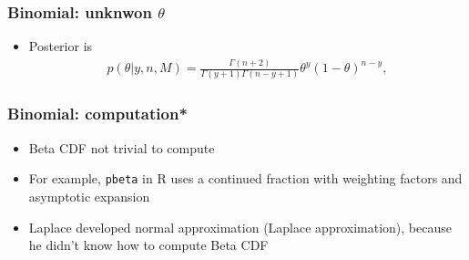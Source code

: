 \documentclass[english,t]{beamer}
\begin{document}
\begin{frame}
  \frametitle{Binomial: unknwon $\theta$}

  \begin{itemize}
  \item Posterior is
    \begin{align*}
      p(\theta|y,n,M) = \frac{\Gamma(n+2)}{\Gamma(y+1)\Gamma(n-y+1)}\theta^y(1-\theta)^{n-y},
    \end{align*}
  \end{itemize}
  \vspace{0.5\baselineskip}
  \begin{center}
  \end{center}
\end{frame}

\begin{frame}
  \frametitle{Binomial: computation*}

  \begin{itemize}
  \item Beta CDF not trivial to compute
  \item For example, {\tt pbeta} in R uses a continued fraction with
    weighting factors and asymptotic expansion
  \item Laplace developed normal approximation (Laplace
    approximation), because he didn't know how to compute Beta CDF
  \end{itemize}

\end{frame}
\end{document}
